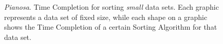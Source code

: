 \begin{figure}[!ht]
	\centering
  	\hspace*{20pt}  
  	
	\caption{\textit{Pianosa}. Time Completion for sorting \textit{small} data sets. Each graphic represents a data set of fixed size, while each shape on a graphic shows the Time Completion of a certain Sorting Algorithm for that data set.}
	\label{NxTxA-small}
\end{figure} 

